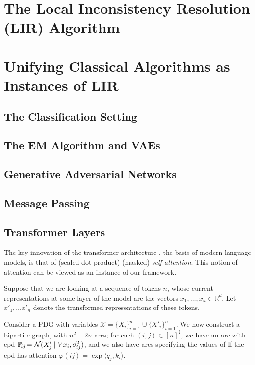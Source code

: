 \documentclass[twoside]{article}
\theoremstyle{plain}
\theoremstyle{definition}
\theoremstyle{remark}
\let\cite\citep
\begin{document}
\section{The Local Inconsistency Resolution (LIR) Algorithm}
\section{Unifying Classical Algorithms as Instances of LIR}
\subsection{The Classification Setting}
\subsection{The EM Algorithm and VAEs}
\subsection{Generative Adversarial Networks}
\subsection{Message Passing}
\subsection{Transformer Layers}


The key innovation of the transformer architecture \cite{vaswani2017attention}, the basis of modern language models, 
is that of (scaled dot-product) (masked) \emph{self-attention}.
This notion of attention can be viewed as an instance of our framework.

Suppose that we are looking at a sequence of tokens $n$, whose current representations at some layer of the model are the vectors $x_1, \ldots, x_n \in \mathbb R^d$. 
Let $x'_1, \ldots x'_n$ denote the transformed representations of these tokens. 

Consider a PDG with variables $\mathcal X = \{ X_i \}_{i=1}^n \cup \{ X'_i\}_{i=1}^n$. 
We now construct a bipartite graph, with $n^2 + 2n$ arcs; for each $(i,j) \in [n]^2$, 
we have an arc 
with cpd $\p_{ij} = \mathcal N(X'_j \mid V x_i, \sigma_{ij}^2)$, and we
   also have arcs specifying the values of
If the cpd has attention $\varphi(ij) = \exp \langle q_j, k_i\rangle$.
\end{document}
